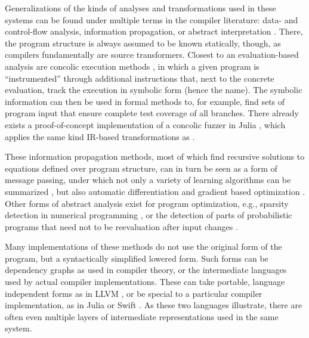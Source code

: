Generalizations of the kinds of analyses and transformations used in these systems can be found
under multiple terms in the compiler literature: data- and control-flow analysis, information
propagation, or abstract interpretation \parencite{muchnick1997advanced,singer2018static}.  There,
the program structure is always assumed to be known statically, though, as compilers fundamentally
are source transformers.  Closest to an evaluation-based analysis are concolic execution methods
\parencite{sen2005cute,zeller2019concolic}, in which a given program is \enquote{instrumented}
through additional instructions that, next to the concrete evaluation, track the execution in
symbolic form (hence the name).  The symbolic information can then be used in formal methods to, for
example, find sets of program input that ensure complete test coverage of all branches.  There
already exists a proof-of-concept implementation of a concolic fuzzer in Julia
\parencite{churavy2019vchuravy}, which applies the same kind IR-based transformations as
.

These information propagation methods, most of which find recursive solutions to equations defined
over program structure, can in turn be seen as a form of message passing, under which not only a
variety of learning algorithms can be summarized \parencite{minka2005divergence}, but also automatic
differentiation \parencite{minka2019automatic} and gradient based optimization
\parencite{dauwels2005steepest}.  Other forms of abstract analysis exist for program optimization,
e.g., sparsity detection in numerical programming \parencite{gowda2019sparsity}, or the detection of
parts of probabilistic programs that need not to be reevaluation after input changes
\parencite{becker2020dynamic}.

Many implementations of these methods do not use the original form of the program, but a
syntactically simplified lowered form.  Such forms can be dependency graphs as used in compiler
theory, or the intermediate languages used by actual compiler implementations.  These can take
portable, language independent forms as in LLVM \parencite{llvmproject2019llvm}, or be special to a
particular compiler implementation, as in Julia \parencite{bezanson2017julia} or Swift
\parencite{apple2020swifta}.  As these two languages illustrate, there are often even multiple
layers of intermediate representations used in the same system.

